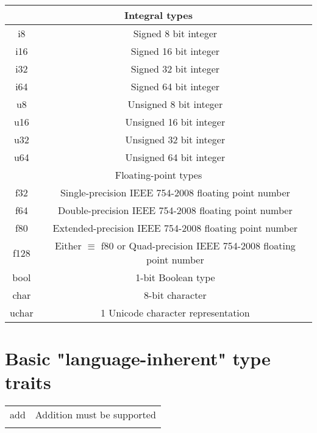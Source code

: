 \documentclass{scrartcl}
\begin{document}
\begin{table}[H]
    \centering
    \begin{tabular}{c|c}
    \multicolumn{2}{c}{Integral types} \\ \hline
        i8 & Signed 8 bit integer \\
        i16 & Signed 16 bit integer \\
        i32 & Signed 32 bit integer \\
        i64 & Signed 64 bit integer \\
        u8 & Unsigned 8 bit integer \\
        u16 & Unsigned 16 bit integer \\
        u32 & Unsigned 32 bit integer \\
        u64 & Unsigned 64 bit integer \\ \hline
    \multicolumn{2}{c}{Floating-point types} \\ \hline
        f32 & Single-precision IEEE 754-2008 floating point number \\
        f64 & Double-precision IEEE 754-2008 floating point number \\
        f80 & Extended-precision IEEE 754-2008 floating point number \\
        f128 & Either $\equiv$ f80 or Quad-precision IEEE 754-2008 floating point number \\ \hline
        bool & 1-bit Boolean type \\ \hline
        char & 8-bit character \\
        uchar & 1 Unicode character representation 
    \end{tabular}
\end{table}

\section{Basic "language-inherent" type traits}

\begin{table}[H]
    \centering
    \begin{tabular}{c|c}
        add & Addition must be supported \\
         & 
    \end{tabular}
\end{table}
\end{document}
